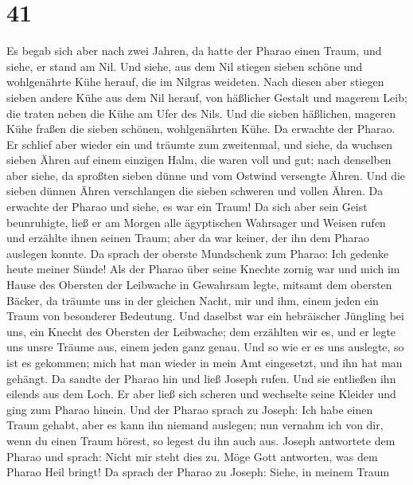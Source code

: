 \hypertarget{section-40}{%
\section{41}\label{section-40}}

 Es begab sich aber nach zwei Jahren, da hatte der Pharao
einen Traum, und siehe, er stand am Nil.  Und siehe, aus
dem Nil stiegen sieben schöne und wohlgenährte Kühe herauf, die im
Nilgras weideten.  Nach diesen aber stiegen sieben andere
Kühe aus dem Nil herauf, von häßlicher Gestalt und magerem Leib; die
traten neben die Kühe am Ufer des Nils.  Und die sieben
häßlichen, mageren Kühe fraßen die sieben schönen, wohlgenährten Kühe.
Da erwachte der Pharao.  Er schlief aber wieder ein und
träumte zum zweitenmal, und siehe, da wuchsen sieben Ähren auf einem
einzigen Halm, die waren voll und gut;  nach denselben
aber siehe, da sproßten sieben dünne und vom Ostwind versengte Ähren.
 Und die sieben dünnen Ähren verschlangen die sieben
schweren und vollen Ähren. Da erwachte der Pharao und siehe, es war ein
Traum!  Da sich aber sein Geist beunruhigte, ließ er am
Morgen alle ägyptischen Wahrsager und Weisen rufen und erzählte ihnen
seinen Traum; aber da war keiner, der ihn dem Pharao auslegen konnte.
 Da sprach der oberste Mundschenk zum Pharao: Ich gedenke
heute meiner Sünde!  Als der Pharao über seine Knechte
zornig war und mich im Hause des Obersten der Leibwache in Gewahrsam
legte, mitsamt dem obersten Bäcker,  da träumte uns in
der gleichen Nacht, mir und ihm, einem jeden ein Traum von besonderer
Bedeutung.  Und daselbst war ein hebräischer Jüngling bei
uns, ein Knecht des Obersten der Leibwache; dem erzählten wir es, und er
legte uns unsre Träume aus, einem jeden ganz genau.  Und
so wie er es uns auslegte, so ist es gekommen; mich hat man wieder in
mein Amt eingesetzt, und ihn hat man gehängt.  Da sandte
der Pharao hin und ließ Joseph rufen. Und sie entließen ihn eilends aus
dem Loch. Er aber ließ sich scheren und wechselte seine Kleider und ging
zum Pharao hinein.  Und der Pharao sprach zu Joseph: Ich
habe einen Traum gehabt, aber es kann ihn niemand auslegen; nun vernahm
ich von dir, wenn du einen Traum hörest, so legest du ihn auch aus.
 Joseph antwortete dem Pharao und sprach: Nicht mir steht
dies zu. Möge Gott antworten, was dem Pharao Heil bringt!
 Da sprach der Pharao zu Joseph: Siehe, in meinem Traum
